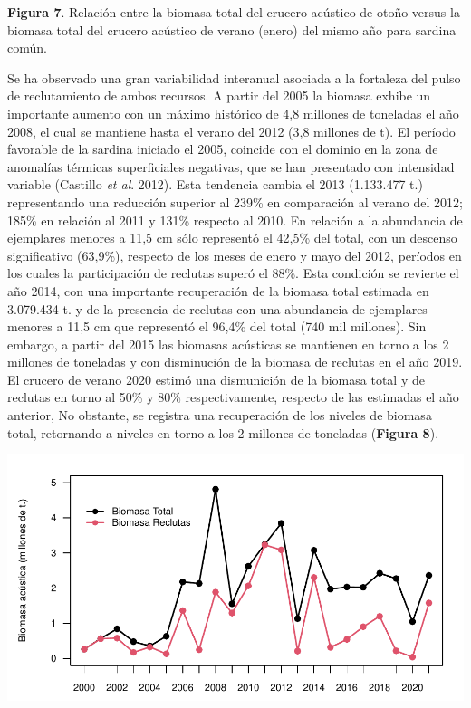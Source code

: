 \documentclass[
  spanish,
]{article}
\begin{document}
\small

\textbf{Figura 7}. Relación entre la biomasa total del crucero acústico
de otoño versus la biomasa total del crucero acústico de verano (enero)
del mismo año para sardina común. \vspace{0.5cm} \normalsize

Se ha observado una gran variabilidad interanual asociada a la fortaleza
del pulso de reclutamiento de ambos recursos. A partir del 2005 la
biomasa exhibe un importante aumento con un máximo histórico de 4,8
millones de toneladas el año 2008, el cual se mantiene hasta el verano
del 2012 (3,8 millones de t). El período favorable de la sardina
iniciado el 2005, coincide con el dominio en la zona de anomalías
térmicas superficiales negativas, que se han presentado con intensidad
variable (Castillo \emph{et al}. 2012). Esta tendencia cambia el 2013
(1.133.477 t.) representando una reducción superior al 239\% en
comparación al verano del 2012; 185\% en relación al 2011 y 131\%
respecto al 2010. En relación a la abundancia de ejemplares menores a
11,5 cm sólo representó el 42,5\% del total, con un descenso
significativo (63,9\%), respecto de los meses de enero y mayo del 2012,
períodos en los cuales la participación de reclutas superó el 88\%. Esta
condición se revierte el año 2014, con una importante recuperación de la
biomasa total estimada en 3.079.434 t. y de la presencia de reclutas con
una abundancia de ejemplares menores a 11,5 cm que representó el 96,4\%
del total (740 mil millones). Sin embargo, a partir del 2015 las
biomasas acústicas se mantienen en torno a los 2 millones de toneladas y
con disminución de la biomasa de reclutas en el año 2019. El crucero de
verano 2020 estimó una dismunición de la biomasa total y de reclutas en
torno al 50\% y 80\% respectivamente, respecto de las estimadas el año
anterior, No obstante, se registra una recuperación de los niveles de
biomasa total, retornando a niveles en torno a los 2 millones de
toneladas (\textbf{Figura 8}).

\begin{center}\includegraphics{FigurasInforme_Marzo/Fig8_ant_reclutasbio-1} \end{center}
\end{document}
